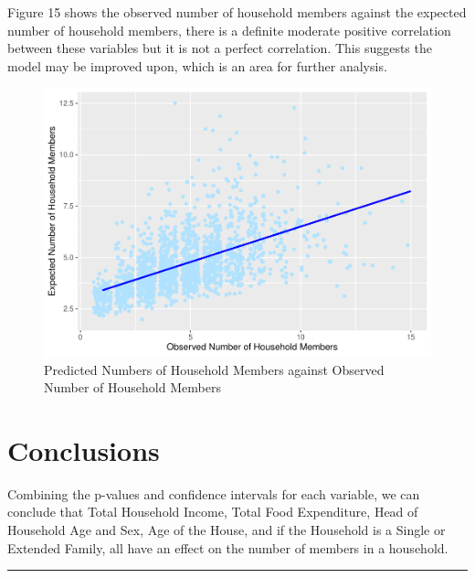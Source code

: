 \documentclass[
]{article}
\begin{document}
Figure 15 shows the observed number of household members against the
expected number of household members, there is a definite moderate
positive correlation between these variables but it is not a perfect
correlation. This suggests the model may be improved upon, which is an
area for further analysis.

\begin{figure}[H]

{\centering \includegraphics[width=0.8\linewidth]{Group_01_files/figure-latex/pred vs obs-1} 

}

\caption{Predicted Numbers of Household Members against Observed Number of Household Members}\label{fig:pred vs obs}
\end{figure}

\hypertarget{sec:Conc}{%
\section{Conclusions}\label{sec:Conc}}

Combining the p-values and confidence intervals for each variable, we
can conclude that Total Household Income, Total Food Expenditure, Head
of Household Age and Sex, Age of the House, and if the Household is a
Single or Extended Family, all have an effect on the number of members
in a household.

\begin{center}\rule{0.5\linewidth}{0.5pt}\end{center}
\end{document}
